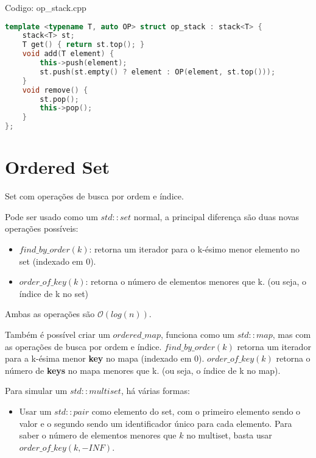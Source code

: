 \documentclass[10pt, a4paper, oneside]{book}
\begin{document}
\hfill

Codigo: op\_stack.cpp

\begin{lstlisting}[language=C++]
template <typename T, auto OP> struct op_stack : stack<T> {
    stack<T> st;
    T get() { return st.top(); }
    void add(T element) {
        this->push(element);
        st.push(st.empty() ? element : OP(element, st.top()));
    }
    void remove() {
        st.pop();
        this->pop();
    }
};\end{lstlisting}
\hfill

\section{Ordered Set}


Set com operações de busca por ordem e índice.



Pode ser usado como um $std::set$ normal, a principal diferença são duas novas operações possíveis:



\begin{itemize}
\item $find\_by\_order(k)$: retorna um iterador para o k-ésimo menor elemento no set (indexado em 0).
\item $order\_of\_key(k)$: retorna o número de elementos menores que k. (ou seja, o índice de k no set)
\end{itemize}



Ambas as operações são $\mathcal{O}(log(n))$.



Também é possível criar um $ordered\_map$, funciona como um $std::map$, mas com as operações de busca por ordem e índice. $find\_by\_order(k)$ retorna um iterador para a k-ésima menor \textbf{key} no mapa (indexado em 0). $order\_of\_key(k)$ retorna o número de \textbf{keys} no mapa menores que k. (ou seja, o índice de k no map).



Para simular um $std::multiset$, há várias formas:



\begin{itemize}
\item Usar um $std::pair$ como elemento do set, com o primeiro elemento sendo o valor e o segundo sendo um identificador único para cada elemento. Para saber o número de elementos menores que $k$ no multiset, basta usar $order\_of\_key({k, -INF})$.
\end{itemize}
\end{document}
